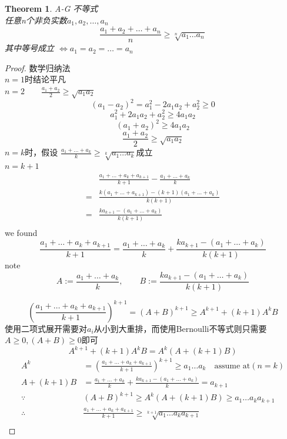 \documentclass[10pt,a4paper]{book}
\newtheorem{theorem}{Theorem}[section]
\begin{document}
	
	
	
	\begin{theorem}
	A-G 不等式\\ 任意n个非负实数$ a_1, a_2, \dots, a_n$ \\
	\begin{equation}
		\frac{a_1 + a_2 + \dots + a_n}{n} \geq \sqrt[n]{a_1\dots a_n}
	\end{equation}
	其中等号成立 $\iff a_1 = a_2 = \dots = a_n$

	\label{thm-1}
	\end{theorem}

	\begin{proof}\label{1}
	数学归纳法\\ $n=1$时结论平凡\\
	$n=2\qquad \frac{a_1+a_2}{2} \geq \sqrt{a_1a_2}$\\
	\[(a_1 - a_2)^2 = a_1^2 - 2 a_1 a_2 + a_2^2 \geq 0 \]
	\[a_1^2 + 2a_1a_2 + a_2^2 \geq 4a_1a_2\]
	\[(a_1+a_2)^2\geq 4a_1a_2\]
	\[\frac{a_1+a_2}{2}\geq \sqrt{a_1a_2}\]
	$n=k$时，假设 $\frac{a_1+\dots+a_k}{k}\geq \sqrt[k]{a_1\dots a_k}$成立\\
	$ n=k+1 $
	\begin{equation}
	\begin{aligned}
		&\frac{a_1+\dots + a_k + a_{k+1}}{k+1}-\frac{a_1+\dots +a_k}{k} \\
		=&\frac{k(a_1+\dots+a_{k+1})-(k+1)(a_1+\dots+a_k)}{k(k+1)}\\
		=&\frac{ka_{k+1}-(a_1+\dots+a_k)}{k(k+1)}\\		
	\end{aligned}
	\end{equation}
	we found 
	\[\frac{a_1+\dots + a_k + a_{k+1}}{k+1} =  \frac{a_1+\dots + a_k}{k} + \frac{ka_{k+1}-(a_1+\dots + a_k)}{k(k+1)} \]
	note \[ A := \frac{a_1+\dots + a_k}{k} , \qquad B:=\frac{ka_{k+1}-(a_1+\dots + a_k)}{k(k+1)}\]
	
	\begin{equation}
		(\frac{a_1+\dots + a_k + a_{k+1}}{k+1})^{k+1}=(A+B)^{k+1}\geq A^{k+1}+(k+1)A^k B
	\end{equation}
	使用二项式展开需要对$ a_i $从小到大重排，而使用Bernoulli不等式则只需要$ A\geq 0, (A+B)\geq 0 $即可
	\begin{equation}
		A^{k+1}+(k+1)A^k B = A^k(A+(k+1)B)
	\end{equation}
	\begin{equation}
		\begin{aligned}
			A^k& =	(\frac{a_1+\dots + a_k + a_{k+1}}{k+1})^{k+1} \geq a_1\dots a_k \quad \text{assume at}(n=k)\\
			A+(k+1)B&= \frac{a_1+\dots + a_k}{k} + \frac{ka_{k+1}-(a_1+\dots + a_k)}{k} = a_{k+1}\\
			\because& (A+B)^{k+1}\geq A^k(A+(k+1)B)\geq a_1 \dots a_k  a_{k+1}\\
			\therefore & 	\frac{a_1+\dots + a_k + a_{k+1}}{k+1} \geq  \sqrt[k+1]{a_1 \dots a_k  a_{k+1}}\\
		\end{aligned}
	\end{equation}
	

\end{proof}
\end{document}
